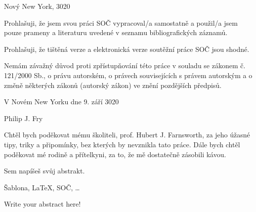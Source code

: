 \documentclass[12pt, a4paper,
 twoside,        %
 openright
]{report}
\newcommand\city{Nový New York} %
\newcommand\consultant{prof. Hubert J. Farnsworth} %
\newcommand\authorName{Philip J. Fry}  %
\newcommand\publicationYear{3020} %
\begin{document}
\noindent \city, \publicationYear

\cleardoublepage


\noindent Prohlašuji, že jsem svou práci SOČ vypracoval/a samostatně a použil/a jsem pouze prameny a literaturu uvedené v seznamu bibliografických záznamů.

\noindent Prohlašuji, že tištěná verze a elektronická verze soutěžní práce SOČ jsou shodné. 

\noindent Nemám závažný důvod proti zpřístupňování této práce v souladu se zákonem č. 121/2000 Sb., o právu autorském, o právech souvisejících s právem autorským a o změně některých zákonů (autorský zákon) ve znění pozdějších předpisů. 

\vspace{24 pt}

\noindent V Novém New Yorku dne 9. září 3020 \dotfill{} 

\hspace{8cm} \authorName

\cleardoublepage

\vspace*{0.8\textheight}

\noindent
Chtěl bych poděkovat mému školiteli, \consultant, za jeho úžasné tipy, triky a připomínky, bez kterých by nevznikla tato práce. Dále bych chtěl poděkovat mé rodině a přítelkyni, za to, že mě dostatečně zásobili kávou.

\cleardoublepage


\noindent Sem napíšeš svůj abstrakt. \lipsum[1] %

\vspace{18pt}


\noindent Šablona, \LaTeX, SOČ, \dots 

\vspace{18pt}


\noindent Write your abstract here! \lipsum[1] %

\vspace{18pt}
\end{document}
